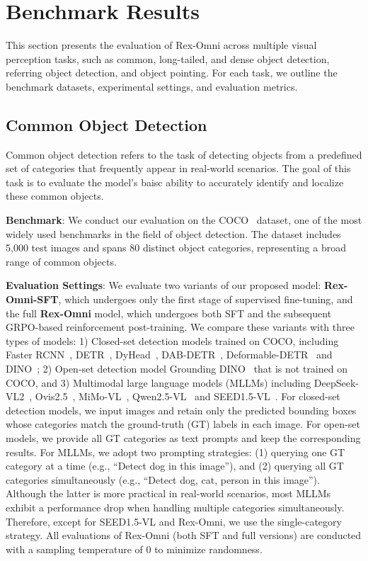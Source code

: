 \section{Benchmark Results}
\label{sec:experiment}
This section presents the evaluation of Rex-Omni across multiple visual perception tasks, such as common, long-tailed, and dense object detection, referring object detection, and object pointing. For each task, we outline the benchmark datasets, experimental settings, and evaluation metrics.

\subsection{Common Object Detection}
\label{sec:coco}
Common object detection refers to the task of detecting objects from a predefined set of categories that frequently appear in real-world scenarios. The goal of this task is to evaluate the model's baisc ability to accurately identify and localize these common objects.



\textbf{Benchmark}: We conduct our evaluation on the COCO~\cite{Datasets:MSCOCO} dataset, one of the most widely used benchmarks in the field of object detection. The dataset includes 5,000 test images and spans 80 distinct object categories, representing a broad range of common objects.

\textbf{Evaluation Settings}: We evaluate two variants of our proposed model: \textbf{Rex-Omni-SFT}, which undergoes only the first stage of supervised fine-tuning, and the full \textbf{Rex-Omni} model, which undergoes both SFT and the subsequent GRPO-based reinforcement post-training. We compare these variants with three types of models: 1) Closed-set detection models trained on COCO, including Faster RCNN~\cite{ren2016faster}, DETR~\cite{carion2020end}, DyHead~\cite{dai2021dynamic}, DAB-DETR~\cite{liu2022dab}, Deformable-DETR~\cite{zhu2020deformable} and DINO~\cite{zhang2022dino}; 2) Open-set detection model Grounding DINO~\cite{liu2023grounding} that is not trained on COCO,  and 3) Multimodal large language models (MLLMs) including DeepSeek-VL2~\cite{wu2024deepseek}, Ovis2.5~\cite{lu2025ovis2}, MiMo-VL~\cite{coreteam2025mimovltechnicalreport}, Qwen2.5-VL~\cite{bai2025qwen2} and SEED1.5-VL~\cite{guo2025seed1}. For closed-set detection models, we input images and retain only the predicted bounding boxes whose categories match the ground-truth (GT) labels in each image. For open-set models, we provide all GT categories as text prompts and keep the corresponding results. For MLLMs, we adopt two prompting strategies: (1) querying one GT category at a time (e.g., “Detect dog in this image”), and (2) querying all GT categories simultaneously (e.g., “Detect dog, cat, person in this image”). Although the latter is more practical in real-world scenarios, most MLLMs exhibit a performance drop when handling multiple categories simultaneously. Therefore, except for SEED1.5-VL and Rex-Omni, we use the single-category strategy. All evaluations of Rex-Omni (both SFT and full versions) are conducted with a sampling temperature of 0 to minimize randomness.


